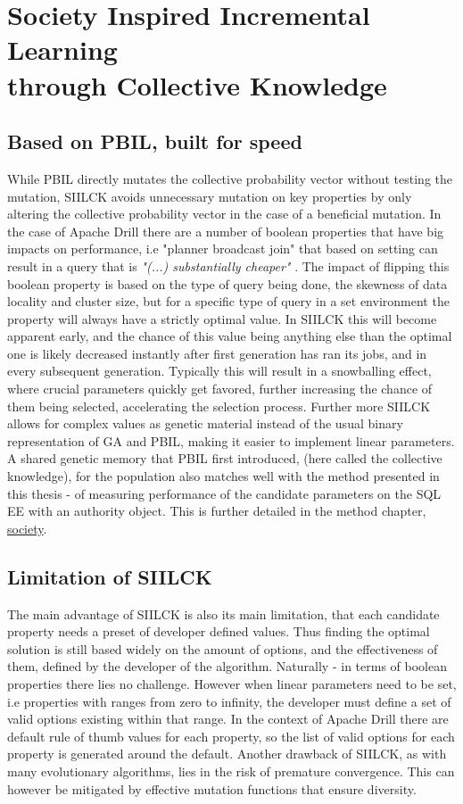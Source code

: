 \documentclass[a4paper,english]{report}
\begin{document}
	\section{Society Inspired Incremental Learning \\through Collective Knowledge}
		\subsection{Based on PBIL, built for speed}
		While PBIL directly mutates the collective probability vector without testing the mutation, SIILCK avoids unnecessary mutation on key properties by only altering the collective probability vector in the case of a beneficial mutation. In the case of Apache Drill there are a number of boolean properties that have big impacts on performance, i.e "planner broadcast join" that based on setting can result in a query that is \textit{"(...) substantially cheaper"} \cite{joinplanning}. The impact of flipping this boolean property is based on the type of query being done, the skewness of data locality and cluster size, but for a specific type of query in a set environment the property will always have a strictly optimal value. In SIILCK this will become apparent early, and the chance of this value being anything else than the optimal one is likely decreased instantly after first generation has ran its jobs, and in every subsequent generation. Typically this will result in a snowballing effect, where crucial parameters quickly get favored, further increasing the chance of them being selected, accelerating the selection process. Further more SIILCK allows for complex values as genetic material instead of the usual binary representation of GA and PBIL, making it easier to implement linear parameters. A shared genetic memory that PBIL first introduced, (here called the collective knowledge), for the population also matches well with the method presented in this thesis - of measuring performance of the candidate parameters on the SQL EE with an authority object. This is further detailed in the method chapter, \hyperref[sec:society]{society}.
		\pagebreak
		\subsection{Limitation of SIILCK}
		The main advantage of SIILCK is also its main limitation, that each candidate property needs a preset of developer defined values. Thus finding the optimal solution is still based widely on the amount of options, and the effectiveness of them, defined by the developer of the algorithm. Naturally - in terms of boolean properties there lies no challenge. However when linear parameters need to be set, i.e properties with ranges from zero to infinity, the developer must define a set of valid options existing within that range. In the context of Apache Drill there are default rule of thumb values for each property, so the list of valid options for each property is generated around the default. Another drawback of SIILCK, as with many evolutionary algorithms, lies in the risk of premature convergence. This can however be mitigated by effective mutation functions that ensure diversity.
	\pagebreak
\end{document}
